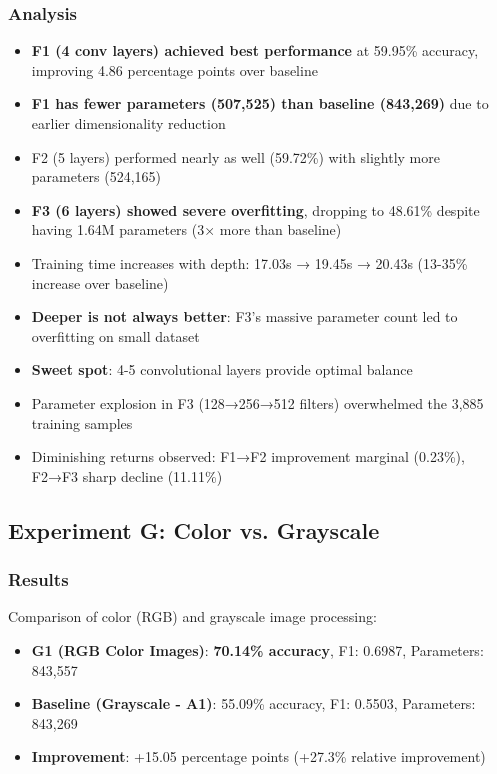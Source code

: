 \documentclass[12pt,a4paper]{article}
\begin{document}
\subsubsection{Analysis}
\begin{itemize}
    \item \textbf{F1 (4 conv layers) achieved best performance} at 59.95\% accuracy, improving 4.86 percentage points over baseline
    \item \textbf{F1 has fewer parameters (507,525) than baseline (843,269)} due to earlier dimensionality reduction
    \item F2 (5 layers) performed nearly as well (59.72\%) with slightly more parameters (524,165)
    \item \textbf{F3 (6 layers) showed severe overfitting}, dropping to 48.61\% despite having 1.64M parameters (3× more than baseline)
    \item Training time increases with depth: 17.03s → 19.45s → 20.43s (13-35\% increase over baseline)
    \item \textbf{Deeper is not always better}: F3's massive parameter count led to overfitting on small dataset
    \item \textbf{Sweet spot}: 4-5 convolutional layers provide optimal balance
    \item Parameter explosion in F3 (128→256→512 filters) overwhelmed the 3,885 training samples
    \item Diminishing returns observed: F1→F2 improvement marginal (0.23\%), F2→F3 sharp decline (11.11\%)
\end{itemize}

\subsection{Experiment G: Color vs. Grayscale}

\subsubsection{Results}
Comparison of color (RGB) and grayscale image processing:

\begin{itemize}
    \item \textbf{G1 (RGB Color Images)}: \textbf{70.14\% accuracy}, F1: 0.6987, Parameters: 843,557
    \item \textbf{Baseline (Grayscale - A1)}: 55.09\% accuracy, F1: 0.5503, Parameters: 843,269
    \item \textbf{Improvement}: +15.05 percentage points (+27.3\% relative improvement)
\end{itemize}
\end{document}
